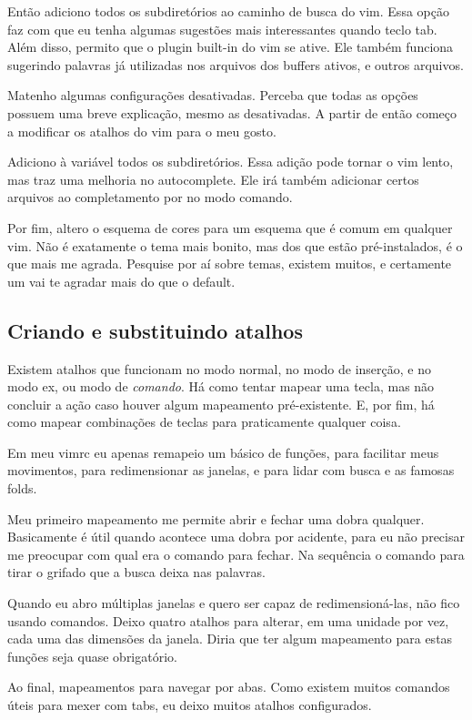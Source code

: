 Então adiciono todos os subdiretórios ao caminho de busca do vim.
Essa opção faz com que eu tenha algumas sugestões mais interessantes quando teclo tab.
Além disso, permito que o plugin built-in do vim se ative.
Ele também funciona sugerindo palavras já utilizadas nos arquivos dos buffers ativos, e outros arquivos.

Matenho algumas configurações desativadas.
Perceba que todas as opções possuem uma breve explicação, mesmo as desativadas.
A partir de então começo a modificar os atalhos do vim para o meu gosto.

Adiciono à variável  todos os subdiretórios.
Essa adição pode tornar o vim lento, mas traz uma melhoria no autocomplete.
Ele irá também adicionar certos arquivos ao completamento por  no modo comando.

Por fim, altero o esquema de cores para um esquema que é comum em qualquer vim.
Não é exatamente o tema mais bonito, mas dos que estão pré-instalados, é o que mais me agrada.
Pesquise por aí sobre temas, existem muitos, e certamente um vai te agradar mais do que o default.


\subsection{Criando e substituindo atalhos}
Existem atalhos que funcionam no modo normal, no modo de inserção, e no modo ex, ou modo de \emph{comando}.
Há como tentar mapear uma tecla, mas não concluir a ação caso houver algum mapeamento pré-existente.
E, por fim, há como mapear combinações de teclas para praticamente qualquer coisa.

Em meu vimrc eu apenas remapeio um básico de funções, para facilitar meus movimentos,
para redimensionar as janelas, e para lidar com busca e as famosas folds.


Meu primeiro mapeamento  me permite
abrir e fechar uma dobra qualquer.
Basicamente é útil quando acontece uma dobra por acidente, para eu não precisar me preocupar com
qual era o comando para fechar.
Na sequência o comando para tirar o grifado que a busca deixa nas palavras.

Quando eu abro múltiplas janelas e quero ser capaz de redimensioná-las, não fico usando comandos.
Deixo quatro atalhos para alterar, em uma unidade por vez, cada uma das dimensões da janela.
Diria que ter algum mapeamento para estas funções seja quase obrigatório.


Ao final, mapeamentos para navegar por abas.
Como existem muitos comandos úteis para mexer com tabs, eu deixo muitos
atalhos configurados.

\newpage
